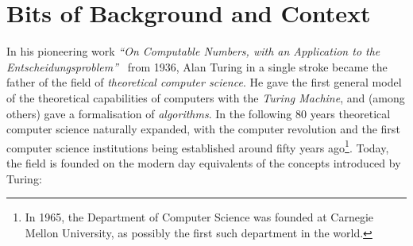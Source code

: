 \section{Bits of Background and Context}\label{sec:in-back}

In his pioneering work \emph{``On Computable Numbers, with an Application to the Entscheidungsproblem''}~\cite{turing1936computable} from 1936, Alan Turing in a single stroke became the father of the field of \emph{theoretical computer science}. He gave the first general model of the theoretical capabilities of computers with the \emph{Turing Machine}, and (among others) gave a formalisation of \emph{algorithms}.
In the following 80 years theoretical computer science naturally expanded, with the computer revolution and the first computer science institutions being established around fifty years ago\footnote{In 1965, the Department of Computer Science was founded at Carnegie Mellon University, as possibly the first such department in the world.}. 
Today, the field is founded on the modern day equivalents of the concepts introduced by Turing:

